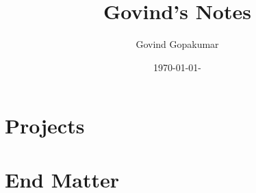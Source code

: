 \documentclass[12pt]{report}
\title{Govind's Notes}
\author{Govind Gopakumar}
\date{\today-\currenttime}
\begin{document}
\maketitle
\tableofcontents


%
%
%


\part{Projects}


\part{End Matter}
\begin{appendices}



\end{appendices}


\clearpage
{}
\nocite{*}%
\printbibliography


%

\clearpage
\printindex
\end{document}
